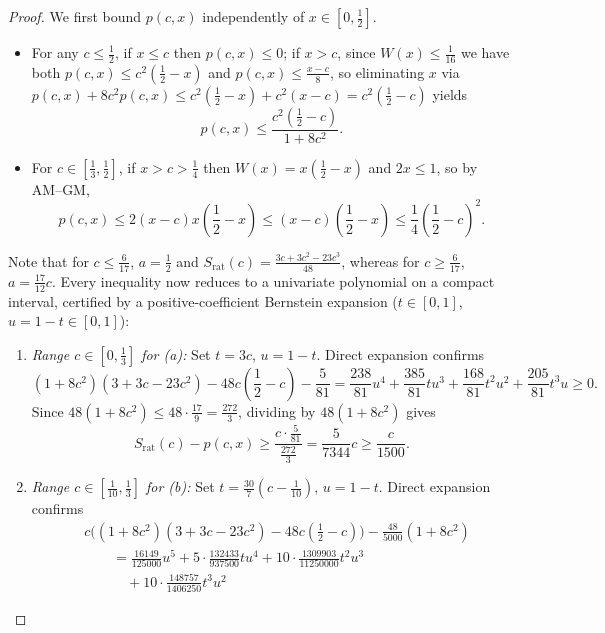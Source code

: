 \documentclass[11pt]{article}
\theoremstyle{definition}
\theoremstyle{remark}
\begin{document}
\begin{proof}
We first bound $p(c, x)$ independently of $x \in [0, \frac{1}{2}]$.
\begin{itemize}[leftmargin=2em]
  \item For any $c \le \frac{1}{2}$, if $x \le c$ then $p(c, x) \le 0$; if $x > c$, since $W(x) \le \frac{1}{16}$ we have both $p(c, x) \le c^2(\frac{1}{2} - x)$ and $p(c, x) \le \frac{x - c}{8}$, so eliminating $x$ via $p(c,x) + 8 c^2 p(c, x) \le c^2(\frac{1}{2} - x) + c^2(x - c) = c^2(\frac{1}{2} - c)$ yields
  \[
    p(c, x) \le \frac{c^2(\frac{1}{2} - c)}{1 + 8 c^2}.
  \]
  \item For $c \in [\frac{1}{3}, \frac{1}{2}]$, if $x > c > \frac{1}{4}$ then $W(x) = x(\frac{1}{2} - x)$ and $2 x \le 1$, so by AM--GM,
  \[
    p(c, x) \le 2(x - c) x \left(\frac{1}{2} - x\right) \le (x - c)\left(\frac{1}{2} - x\right) \le \frac{1}{4}\left(\frac{1}{2} - c\right)^2.
  \]
\end{itemize}
Note that for $c \le \frac{6}{17}$, $a = \frac{1}{2}$ and $S_{\mathrm{rat}}(c) = \frac{3c + 3c^2 - 23 c^3}{48}$, whereas for $c \ge \frac{6}{17}$, $a = \frac{17}{12} c$. Every inequality now reduces to a univariate polynomial on a compact interval, certified by a positive-coefficient Bernstein expansion ($t \in [0, 1]$, $u = 1 - t \in [0, 1]$):
\begin{enumerate}[label=(\roman*), leftmargin=2em]
  \item \emph{Range $c \in [0, \frac{1}{3}]$ for (a):} Set $t = 3c$, $u = 1 - t$. Direct expansion confirms
  \[
    (1 + 8 c^2)(3 + 3c - 23 c^2) - 48 c\!\left(\frac{1}{2} - c\right) - \frac{5}{81}
    = \frac{238}{81} u^4 + \frac{385}{81} t u^3 + \frac{168}{81} t^2 u^2 + \frac{205}{81} t^3 u \ge 0.
  \]
  Since $48(1 + 8 c^2) \le 48 \cdot \frac{17}{9} = \frac{272}{3}$, dividing by $48(1 + 8c^2)$ gives
  \[
    S_{\mathrm{rat}}(c) - p(c, x) \ge \frac{c \cdot \frac{5}{81}}{\frac{272}{3}} = \frac{5}{7344} c \ge \frac{c}{1500}.
  \]
  \item \emph{Range $c \in [\frac{1}{10}, \frac{1}{3}]$ for (b):} Set $t = \frac{30}{7}(c - \frac{1}{10})$, $u = 1 - t$. Direct expansion confirms
  \begin{align*}
    &c\bigl((1 + 8c^2)(3 + 3c - 23c^2) - 48c(\tfrac{1}{2} - c)\bigr) - \frac{48}{5000}(1 + 8c^2) \\
    &\qquad = \frac{16149}{125000} u^5 + 5 \cdot \frac{132433}{937500} t u^4
      + 10 \cdot \frac{1309903}{11250000} t^2 u^3 \\
    &\qquad\quad + 10 \cdot \frac{148757}{1406250} t^3 u^2

\end{align*}
\end{enumerate}
\end{proof}
\end{document}
